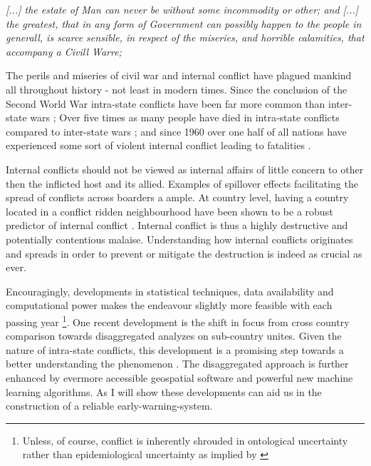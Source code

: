 \documentclass[a4paper]{article}
\begin{document}
\begin{displayquote}
\emph{[...] the estate of Man can never be without some incommodity or other; and [...] the greatest, that in any form of Government can possibly happen to the people in generall, is scarce sensible, in respect of the miseries, and horrible calamities, that accompany a Civill Warre;} \cite[128]{Hobbes_1991}  \par

\end{displayquote}

The perils and miseries of civil war and internal conflict have plagued mankind all throughout history - not least in modern times. Since the conclusion of the Second World War intra-state conflicts have been far more common than inter-state wars \citep[563]{Collier_Hoeffler_2004}; Over five times as many people have died in intra-state conflicts compared to inter-state wars \citep[563]{Collier_Hoeffler_2004}; and since 1960 over one half of all nations have experienced some sort of violent internal conflict leading to fatalities \citep[3-4]{Blattman_Miguel_2010}.\par

Internal conflicts should not be viewed as internal affairs of little concern to other then the inflicted host and its allied. Examples of spillover effects facilitating the spread of conflicts across boarders a ample. At country level, having a country located in a conflict ridden neighbourhood have been shown to be a robust predictor of internal conflict \citep{Hegre_Sambanis_2006,Goldstone_2010}. Internal conflict is thus a highly destructive and potentially contentious malaise. Understanding how internal conflicts originates and spreads in order to prevent or mitigate the destruction is indeed as crucial as ever.\par

Encouragingly, developments in statistical techniques, data availability and computational power makes the endeavour slightly more feasible with each passing year \footnote{Unless, of course, conflict is inherently shrouded in ontological uncertainty rather than epidemiological uncertainty as implied by \cite{Gartzke_1999}}. One recent development is the shift in focus from cross country comparison towards disaggregated analyzes on sub-country unites. Given the nature of intra-state conflicts, this development is a promising step towards a better understanding the phenomenon \citep{Cederman_Gleditsch_2009}. The disaggregated approach is further enhanced by evermore accessible geospatial software and powerful new machine learning algorithms. As I will show these developments can aid us in the construction of a reliable early-warning-system.\par
\end{document}

